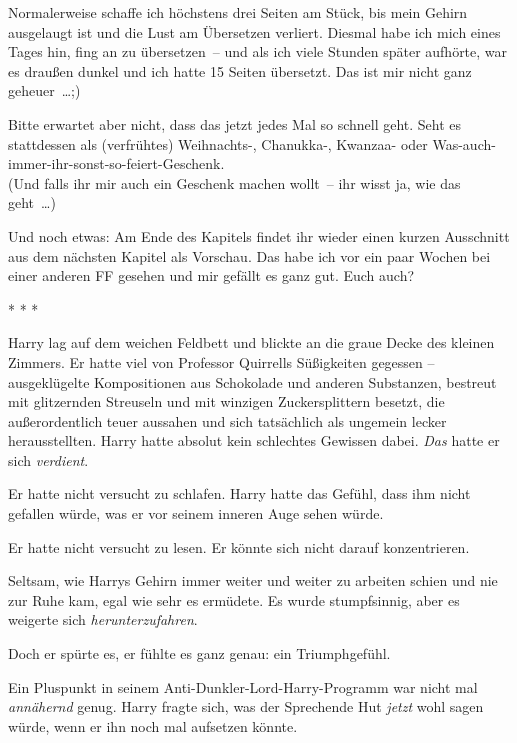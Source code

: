

\hypertarget{der-satz-von-bayes}{%

Normalerweise schaffe ich höchstens drei Seiten am Stück, bis mein Gehirn ausgelaugt ist und die Lust am Übersetzen verliert. Diesmal habe ich mich eines Tages hin, fing an zu übersetzen~-- und als ich viele Stunden später aufhörte, war es draußen dunkel und ich hatte 15 Seiten übersetzt. Das ist mir nicht ganz geheuer~…;)

Bitte erwartet aber nicht, dass das jetzt jedes Mal so schnell geht. Seht es stattdessen als (verfrühtes) Weihnachts-, Chanukka-, Kwanzaa- oder Was-auch-immer-ihr-sonst-so-feiert-Geschenk.\\ (Und falls ihr mir auch ein Geschenk machen wollt~-- ihr wisst ja, wie das geht~…)

Und noch etwas: Am Ende des Kapitels findet ihr wieder einen kurzen Ausschnitt aus dem nächsten Kapitel als Vorschau. Das habe ich vor ein paar Wochen bei einer anderen FF gesehen und mir gefällt es ganz gut. Euch auch?

* * *

Harry lag auf dem weichen Feldbett und blickte an die graue Decke des kleinen Zimmers. Er hatte viel von Professor Quirrells Süßigkeiten gegessen -- ausgeklügelte Kompositionen aus Schokolade und anderen Substanzen, bestreut mit glitzernden Streuseln und mit winzigen Zuckersplittern besetzt, die außerordentlich teuer aussahen und sich tatsächlich als ungemein lecker herausstellten. Harry hatte absolut kein schlechtes Gewissen dabei. \emph{Das} hatte er sich \emph{verdient}.

Er hatte nicht versucht zu schlafen. Harry hatte das Gefühl, dass ihm nicht gefallen würde, was er vor seinem inneren Auge sehen würde.

Er hatte nicht versucht zu lesen. Er könnte sich nicht darauf konzentrieren.

Seltsam, wie Harrys Gehirn immer weiter und weiter zu arbeiten schien und nie zur Ruhe kam, egal wie sehr es ermüdete. Es wurde stumpfsinnig, aber es weigerte sich \emph{herunterzufahren}.

Doch er spürte es, er fühlte es ganz genau: ein Triumphgefühl.

Ein Pluspunkt in seinem Anti-Dunkler-Lord-Harry-Programm war nicht mal \emph{annähernd} genug. Harry fragte sich, was der Sprechende Hut \emph{jetzt} wohl sagen würde, wenn er ihn noch mal aufsetzen könnte.

}

